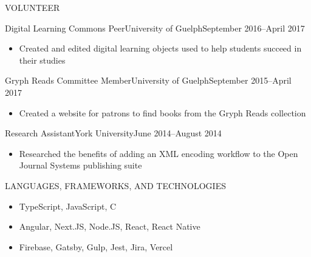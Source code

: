 \documentclass[]{mcdowellcv}
\begin{document}
  \begin{cvsection}{VOLUNTEER}
    \begin{cvsubsection}{Digital Learning Commons Peer}{University of Guelph}{September 2016--April 2017}
   \begin{itemize}
     \item Created and edited digital learning objects used to help students succeed in their studies
   \end{itemize}
 \end{cvsubsection}

     \begin{cvsubsection}{Gryph Reads Committee Member}{University of Guelph}{September 2015--April 2017}
   \begin{itemize}
     \item Created a website for patrons to find books from the Gryph Reads collection
   \end{itemize}
 \end{cvsubsection}


     \begin{cvsubsection}{Research Assistant}{York University}{June 2014--August 2014}
   \begin{itemize}
     \item Researched the benefits of adding an XML encoding workflow to the Open Journal Systems publishing suite
   \end{itemize}
 \end{cvsubsection}
\end{cvsection}

	\begin{cvsection}{LANGUAGES, FRAMEWORKS, AND TECHNOLOGIES}
		\begin{cvsubsection}{}{}{}	
			\begin{itemize}
				\item TypeScript, JavaScript, C
				\item Angular, Next.JS, Node.JS, React, React Native
				\item Firebase, Gatsby, Gulp, Jest, Jira, Vercel
			\end{itemize}
		\end{cvsubsection}
	\end{cvsection}
	
\end{document}
